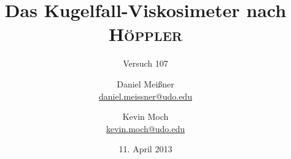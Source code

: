


\newcommand{\name}[1]{\textsc{#1}}

\titlehead{{TU Dortmund \hfill SS~13\\}
Fakultät Physik\\
Experimentelle Übungen II}

\subject{Versuchsprotokoll}
\title{Das Kugelfall-Viskosimeter nach \name{Höppler}}
\subtitle{Versuch 107}

\author{Daniel Meißner\\
{\normalsize\url{daniel.meissner@udo.edu}}
\and
Kevin Moch\\
{\normalsize\url{kevin.moch@udo.edu}}}

\date{11. April 2013}


\maketitle

\tableofcontents
\clearpage








\printbibliography
\nocite{v107}

\theappendix


